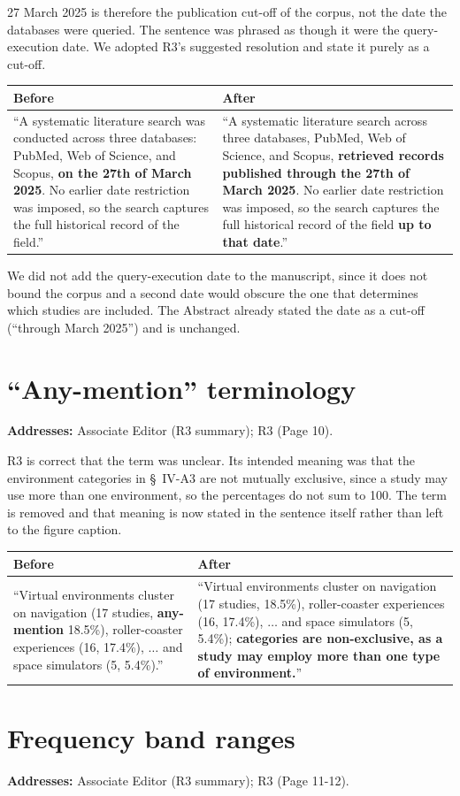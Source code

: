 \documentclass[11pt,a4paper]{article}
\makeatletter
\newcommand{\diffbox}[2]{%
  \begin{center}
  \small
  \begin{tabular}{@{}p{0.46\textwidth}@{\hspace{2em}}p{0.46\textwidth}@{}}
  \toprule
  \textbf{Before} & \textbf{After} \\
  \midrule
  #1 & #2 \\
  \bottomrule
  \end{tabular}
  \end{center}}
\newcommand{\addresses}[1]{\par\noindent\textbf{\small Addresses:} {\small #1}\par\smallskip}
\makeatother
\begin{document}
27 March 2025 is therefore the publication cut-off of the corpus, not the date the databases were queried. The sentence was phrased as though it were the query-execution date. We adopted R3's suggested resolution and state it purely as a cut-off.

\diffbox{``A systematic literature search was conducted across three databases: PubMed, Web of Science, and Scopus, \textbf{on the 27th of March 2025}. No earlier date restriction was imposed, so the search captures the full historical record of the field.''}{``A systematic literature search across three databases, PubMed, Web of Science, and Scopus, \textbf{retrieved records published through the 27th of March 2025}. No earlier date restriction was imposed, so the search captures the full historical record of the field \textbf{up to that date}.''}

\noindent We did not add the query-execution date to the manuscript, since it does not bound the corpus and a second date would obscure the one that determines which studies are included. The Abstract already stated the date as a cut-off (``through March 2025'') and is unchanged.

\section{``Any-mention'' terminology}\label{sec:anymention}
\addresses{Associate Editor (R3 summary); R3 (Page 10).}

R3 is correct that the term was unclear. Its intended meaning was that the environment categories in \S~IV-A3 are not mutually exclusive, since a study may use more than one environment, so the percentages do not sum to 100. The term is removed and that meaning is now stated in the sentence itself rather than left to the figure caption.

\diffbox{``Virtual environments cluster on navigation (17 studies, \textbf{any-mention} 18.5\%), roller-coaster experiences (16, 17.4\%), $\ldots$ and space simulators (5, 5.4\%).''}{``Virtual environments cluster on navigation (17 studies, 18.5\%), roller-coaster experiences (16, 17.4\%), $\ldots$ and space simulators (5, 5.4\%); \textbf{categories are non-exclusive, as a study may employ more than one type of environment.}''}

\section{Frequency band ranges}\label{sec:bands}
\addresses{Associate Editor (R3 summary); R3 (Page 11-12).}
\end{document}
